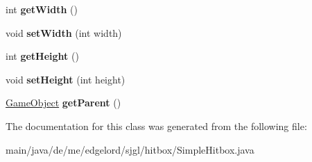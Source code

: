 \begin{DoxyCompactItemize}
int {\bfseries get\+Width} ()
\item 
\mbox{\label{classde_1_1me_1_1edgelord_1_1sjgl_1_1hitbox_1_1_simple_hitbox_a8683bb99b2efebdc9e7c054ed8c96677}} 
void {\bfseries set\+Width} (int width)
\item 
\mbox{\label{classde_1_1me_1_1edgelord_1_1sjgl_1_1hitbox_1_1_simple_hitbox_a2a4879a6d4ee8502fcb679089aea94e7}} 
int {\bfseries get\+Height} ()
\item 
\mbox{\label{classde_1_1me_1_1edgelord_1_1sjgl_1_1hitbox_1_1_simple_hitbox_a70c03eeb49f7f2379f4c83c4968fc7bc}} 
void {\bfseries set\+Height} (int height)
\item 
\mbox{\label{classde_1_1me_1_1edgelord_1_1sjgl_1_1hitbox_1_1_simple_hitbox_af5786b77fff5e87db56e3dfe181b7b4f}} 
\mbox{\hyperlink{classde_1_1me_1_1edgelord_1_1sjgl_1_1gameobject_1_1_game_object}{Game\+Object}} {\bfseries get\+Parent} ()
\end{DoxyCompactItemize}


The documentation for this class was generated from the following file\+:\begin{DoxyCompactItemize}
\item 
main/java/de/me/edgelord/sjgl/hitbox/Simple\+Hitbox.\+java\end{DoxyCompactItemize}

